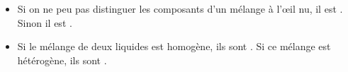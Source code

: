 \begin{mybilan}
	\begin{itemize}
		\item Si on ne peu pas distinguer les composants d'un mélange à l'\oe il nu, il est . Sinon il est .\pause
		
		\item Si le mélange de deux liquides est homogène, ils sont . Si ce mélange est hétérogène, ils sont .
	\end{itemize}
\end{mybilan}